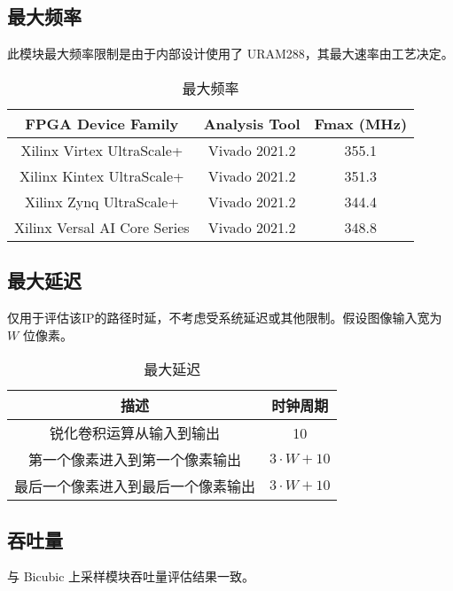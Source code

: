 \documentclass[12pt, a4paper, oneside]{ctexbook}
\begin{document}
		\subsection{最大频率}
		此模块最大频率限制是由于内部设计使用了 URAM288，其最大速率由工艺决定。
		\begin{table}[h]
			\centering
			\begin{tabular}{|c|c|c|}
				\hline
				\textbf{FPGA Device Family}  & \textbf{Analysis Tool} & \textbf{Fmax (MHz)} \\ \hline
				Xilinx Virtex UltraScale+    & Vivado 2021.2          & 355.1               \\ \hline
				Xilinx Kintex UltraScale+    & Vivado 2021.2          & 351.3               \\ \hline
				Xilinx Zynq UltraScale+      & Vivado 2021.2          & 344.4               \\ \hline
				Xilinx Versal AI Core Series & Vivado 2021.2          & 348.8               \\ \hline
			\end{tabular}
		\caption{最大频率}
		\end{table}	
		\newpage
		\subsection{最大延迟}
		仅用于评估该IP的路径时延，不考虑受系统延迟或其他限制。假设图像输入宽为 $W$ 位像素。
		\begin{table}[htb]
			\centering
			\begin{tabular}{|c|c|}
				\hline
				\textbf{描述}       & \textbf{时钟周期}  \\ \hline
				锐化卷积运算从输入到输出      & 10                            \\ \hline
				第一个像素进入到第一个像素输出   & $3\cdot W+10$                 \\ \hline
				最后一个像素进入到最后一个像素输出 & $3\cdot W + 10$            \\ \hline
			\end{tabular}
		\caption{最大延迟}
		\end{table}
		\subsection{吞吐量}
		与 Bicubic 上采样模块吞吐量评估结果一致。
\end{document}
